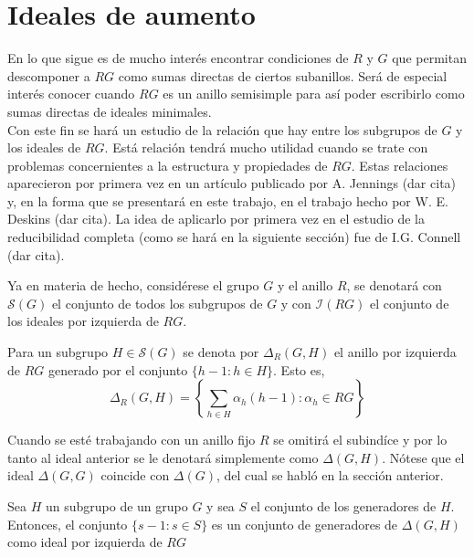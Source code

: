\section{Ideales de aumento}

En lo que sigue es de mucho interés encontrar condiciones de $R$ y $G$ que permitan descomponer a $RG$ como sumas directas de ciertos subanillos. Será de especial interés conocer cuando $RG$ es un anillo semisimple para así poder escribirlo como sumas directas de ideales minimales. \\


Con este fin se hará un estudio de la relación que hay entre los subgrupos de $G$ y los ideales de $RG$. Está relación tendrá mucho utilidad cuando se trate con problemas concernientes a la estructura y propiedades de $RG$. Estas relaciones aparecieron por primera vez en un artículo publicado por A. Jennings (dar cita) y, en la forma que se presentará en este trabajo, en el trabajo hecho por W. E. Deskins (dar cita). La idea de aplicarlo por primera vez en el estudio de la reducibilidad completa (como se hará en la siguiente sección) fue de I.G. Connell (dar cita).

Ya en materia de hecho, considérese el grupo $G$ y el anillo $R$, se denotará con $\mathcal{S}(G)$  el conjunto de todos los subgrupos de $G$ y con $\mathcal{I}(RG)$ el conjunto de los ideales por izquierda de $RG$.

\begin{definicion}
Para un subgrupo $H \in \mathcal{S}(G)$ se denota por $\Delta_{R}(G,H)$ el anillo por izquierda de $RG$ generado por el conjunto $\{h-1: h \in H \}$. Esto es, 
\begin{equation}
\Delta_{R}(G,H) = \left\{ \sum_{h \in H} \alpha_h(h-1) : \alpha_h \in RG \right\}
\end{equation}
\end{definicion}

Cuando se esté trabajando con un anillo fijo $R$ se omitirá el subindíce y por lo tanto al ideal anterior se le denotará simplemente como $\Delta(G,H)$. Nótese que el ideal $\Delta(G,G)$ coincide con $\Delta(G)$, del cual se habló en la sección anterior.

\begin{lema}
Sea $H$ un subgrupo de un grupo $G$ y sea $S$ el conjunto de los generadores de $H$. Entonces, el conjunto $\{ s-1 : s \in S \}$ es un conjunto de generadores de $\Delta (G,H) $ como ideal por izquierda de $RG$ 

\end{lema}

